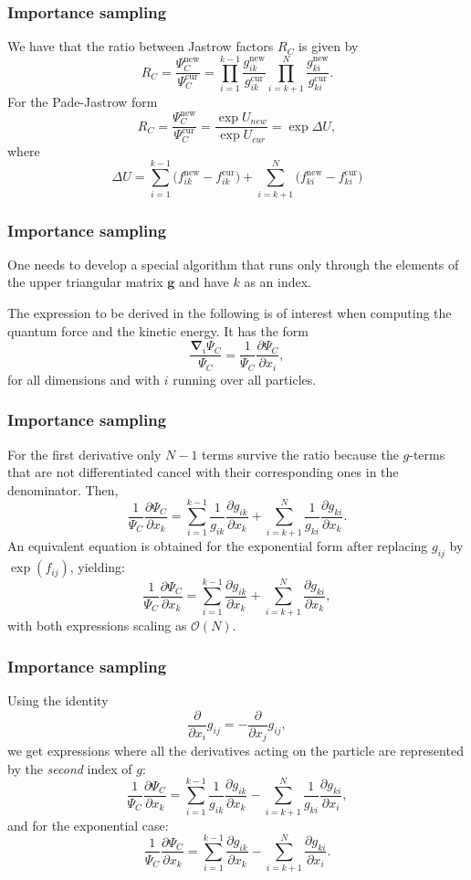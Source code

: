 \documentclass{beamer}
\begin{document}
\begin{frame}
\frametitle{Importance sampling}

We have that the ratio between Jastrow factors $R_C$ is given by
\[
R_{C} = \frac{\Psi_{C}^\mathrm{new}}{\Psi_{C}^\mathrm{cur}} =
\prod_{i=1}^{k-1}\frac{g_{ik}^\mathrm{new}}{g_{ik}^\mathrm{cur}}
\prod_{i=k+1}^{N}\frac{ g_{ki}^\mathrm{new}} {g_{ki}^\mathrm{cur}}.
\]
For the Pade-Jastrow form
\[
 R_{C} = \frac{\Psi_{C}^\mathrm{new}}{\Psi_{C}^\mathrm{cur}} = 
\frac{\exp{U_{new}}}{\exp{U_{cur}}} = \exp{\Delta U},
\]
where
\[
\Delta U =
\sum_{i=1}^{k-1}\big(f_{ik}^\mathrm{new}-f_{ik}^\mathrm{cur}\big)
+
\sum_{i=k+1}^{N}\big(f_{ki}^\mathrm{new}-f_{ki}^\mathrm{cur}\big)
\]
\end{frame}

\begin{frame}
\frametitle{Importance sampling}

One needs to develop a special algorithm 
that runs only through the elements of the upper triangular
matrix $\mathbf{g}$ and have $k$ as an index. 

The expression to be derived in the following is of interest when computing the quantum force and the kinetic energy. It has the form
\[
\frac{\mathbf{\nabla}_i\Psi_C}{\Psi_C} = \frac{1}{\Psi_C}\frac{\partial \Psi_C}{\partial x_i},
\]
for all dimensions and with $i$ running over all particles.
\end{frame}

\begin{frame}
\frametitle{Importance sampling}

For the first derivative only $N-1$ terms survive the ratio because the $g$-terms that are not differentiated cancel with their corresponding ones in the denominator. Then,
\[
\frac{1}{\Psi_C}\frac{\partial \Psi_C}{\partial x_k} =
\sum_{i=1}^{k-1}\frac{1}{g_{ik}}\frac{\partial g_{ik}}{\partial x_k}
+
\sum_{i=k+1}^{N}\frac{1}{g_{ki}}\frac{\partial g_{ki}}{\partial x_k}.
\]
An equivalent equation is obtained for the exponential form after replacing $g_{ij}$ by $\exp(f_{ij})$, yielding:
\[
\frac{1}{\Psi_C}\frac{\partial \Psi_C}{\partial x_k} =
\sum_{i=1}^{k-1}\frac{\partial g_{ik}}{\partial x_k}
+
\sum_{i=k+1}^{N}\frac{\partial g_{ki}}{\partial x_k},
\]
with both expressions scaling as $\mathcal{O}(N)$.
\end{frame}

\begin{frame}
\frametitle{Importance sampling}

Using the identity 
\[
\frac{\partial}{\partial x_i}g_{ij} = -\frac{\partial}{\partial x_j}g_{ij},
\]
we get expressions where all the derivatives acting on the particle  are represented by the \emph{second} index of $g$:
\[
\frac{1}{\Psi_C}\frac{\partial \Psi_C}{\partial x_k} =
\sum_{i=1}^{k-1}\frac{1}{g_{ik}}\frac{\partial g_{ik}}{\partial x_k}
-\sum_{i=k+1}^{N}\frac{1}{g_{ki}}\frac{\partial g_{ki}}{\partial x_i},
\]
and for the exponential case:
\[
\frac{1}{\Psi_C}\frac{\partial \Psi_C}{\partial x_k} =
\sum_{i=1}^{k-1}\frac{\partial g_{ik}}{\partial x_k}
-\sum_{i=k+1}^{N}\frac{\partial g_{ki}}{\partial x_i}.
\]
\end{frame}
\end{document}
